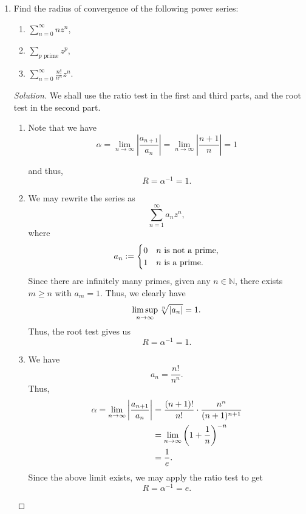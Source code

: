 \documentclass[11pt]{article}
\theoremstyle{definition}
\newenvironment{soln}{\begin{proof}[Solution]}{\end{proof}}
\begin{document}
\begin{enumerate}[leftmargin=*]
    \item Find the radius of convergence of the following power series:
    \begin{enumerate}
        \item \( \displaystyle\sum_{n=0}^{\infty} nz^n \),
        \item \( \displaystyle\sum_{p \text{ prime}} z^p \), 
        \item \( \displaystyle\sum_{n=0}^{\infty} \frac{n!}{n^n} z^n \).
    \end{enumerate}
    \begin{soln}
    We shall use the ratio test in the first and third parts, and the root test in the second part.
        \begin{enumerate}
            \item
            Note that we have
			\begin{equation*} 
			   \alpha = \lim_{n \to \infty}\left|\dfrac{a_{n+1}}{a_n}\right|= \lim_{n \to \infty}\left|\dfrac{n+1}{n}\right|= 1
			\end{equation*}
			
			and thus,
			\begin{equation*} 
				R = \alpha^{-1} = 1.
			\end{equation*}
            
            \item We may rewrite the series as
            \[
                \sum_{n=1}^{\infty} a_n z^n,
            \]
            where
            \[
                a_n \vcentcolon= \begin{cases}
                    0 & n \text{ is not a prime}, \\
                    1 & n \text{ is a prime.}
                \end{cases}
            \]
            Since there are infinitely many primes, given any $n \in \mathbb{N}$, there exists $m \geq n$ with $a_m = 1$. Thus, we clearly have
            \[
                \limsup_{n \to \infty} \sqrt[n]{\abs{a_n}} = 1.
            \]
            Thus, the root test gives us
            \[
                R = \alpha^{-1} = 1.
            \]
            
            \item We have
            \[
                a_n = \frac{n!}{n^n}.
            \]
            Thus, 
            \begin{align*}
                \alpha = \lim_{n \to \infty} \abs{\frac{a_{n+1}}{a_n}} &= \frac{(n+1)!}{n!} \cdot \frac{n^n}{(n+1)^{n+1}} \\
                &= \lim_{n \to \infty} \left( 1 + \frac{1}{n} \right)^{-n} \\
                &= \frac{1}{e}.
            \end{align*}
            Since the above limit exists, we may apply the ratio test to get
            \[
                R = \alpha^{-1} = e.
            \] \qedhere
        \end{enumerate}
    \end{soln}
    

\end{enumerate}
\end{document}
